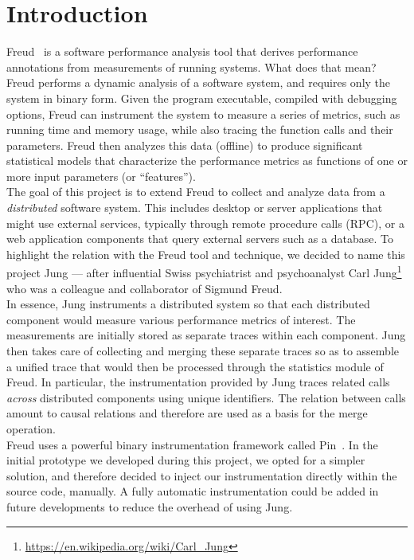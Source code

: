 \chapter{Introduction}

Freud~\cite{freud} is a software performance analysis tool that
derives performance annotations from measurements of running
systems. What does that mean?  Freud performs a dynamic analysis of a
software system, and requires only the system in binary form.  Given
the program executable, compiled with debugging options, Freud can
instrument the system to measure a series of metrics, such as running
time and memory usage, while also tracing the function calls and their
parameters. Freud then analyzes this data (offline) to produce
significant statistical models that characterize the performance
metrics as functions of one or more input parameters (or
``features'').\\

The goal of this project is to extend Freud to collect and analyze
data from a \emph{distributed} software system.  This includes desktop
or server applications that might use external services, typically
through remote procedure calls (RPC), or a web application components
that query external servers such as a database.  To highlight the
relation with the Freud tool and technique, we decided to name this
project Jung --- after influential Swiss psychiatrist and psychoanalyst
Carl Jung\footnote{\url{https://en.wikipedia.org/wiki/Carl_Jung}} who
was a colleague and collaborator of Sigmund Freud.\\

In essence, Jung instruments a distributed system so that each
distributed component would measure various performance metrics of
interest.  The measurements are initially stored as separate traces
within each component.  Jung then takes care of collecting and merging
these separate traces so as to assemble a unified trace that would
then be processed through the statistics module of Freud.  In
particular, the instrumentation provided by Jung traces related calls
\emph{across} distributed components using unique identifiers.  The 
relation between calls amount to causal relations and therefore are
used as a basis for the merge operation.\\

Freud uses a powerful binary instrumentation framework called
Pin~\cite{PIN}.  In the initial prototype we developed during this
project, we opted for a simpler solution, and therefore decided to
inject our instrumentation directly within the source code, manually.
A fully automatic instrumentation could be added in future
developments to reduce the overhead of using Jung.


